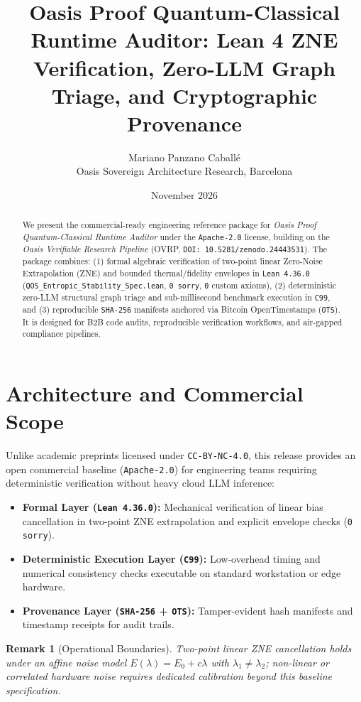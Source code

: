 \documentclass[11pt,a4paper]{article}
\title{Oasis Proof Quantum-Classical Runtime Auditor: Lean 4 ZNE Verification, Zero-LLM Graph Triage, and Cryptographic Provenance}
\author{Mariano Panzano Caball\'e \\ \small Oasis Sovereign Architecture Research, Barcelona}
\date{November 2026}
\newtheorem{remark}{Remark}
\begin{document}
\maketitle

\begin{abstract}
We present the commercial-ready engineering reference package for \emph{Oasis Proof Quantum-Classical Runtime Auditor} under the \texttt{Apache-2.0} license, building on the \emph{Oasis Verifiable Research Pipeline} (OVRP, \texttt{DOI: 10.5281/zenodo.24443531}). The package combines: (1) formal algebraic verification of two-point linear Zero-Noise Extrapolation (ZNE) and bounded thermal/fidelity envelopes in \texttt{Lean~4.36.0} (\texttt{QOS\_Entropic\_Stability\_Spec.lean}, \texttt{0 sorry}, \texttt{0} custom axioms), (2) deterministic zero-LLM structural graph triage and sub-millisecond benchmark execution in \texttt{C99}, and (3) reproducible \texttt{SHA-256} manifests anchored via Bitcoin OpenTimestamps (\texttt{OTS}). It is designed for B2B code audits, reproducible verification workflows, and air-gapped compliance pipelines.
\end{abstract}

\section{Architecture and Commercial Scope}
Unlike academic preprints licensed under \texttt{CC-BY-NC-4.0}, this release provides an open commercial baseline (\texttt{Apache-2.0}) for engineering teams requiring deterministic verification without heavy cloud LLM inference:
\begin{itemize}
  \item \textbf{Formal Layer (\texttt{Lean~4.36.0}):} Mechanical verification of linear bias cancellation in two-point ZNE extrapolation and explicit envelope checks (\texttt{0 sorry}).
  \item \textbf{Deterministic Execution Layer (\texttt{C99}):} Low-overhead timing and numerical consistency checks executable on standard workstation or edge hardware.
  \item \textbf{Provenance Layer (\texttt{SHA-256} + \texttt{OTS}):} Tamper-evident hash manifests and timestamp receipts for audit trails.
\end{itemize}

\begin{remark}[Operational Boundaries]
Two-point linear ZNE cancellation holds under an affine noise model $E(\lambda) = E_0 + c\lambda$ with $\lambda_1 \neq \lambda_2$; non-linear or correlated hardware noise requires dedicated calibration beyond this baseline specification.
\end{remark}
\end{document}
